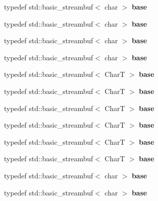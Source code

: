 \begin{DoxyCompactItemize}
\mbox{\label{structtest_ae7488bd18a7ecb2581088e9de82559ad}} 
typedef std\+::basic\+\_\+streambuf$<$ char $>$ {\bfseries base}
\item 
\mbox{\label{structtest_ae7488bd18a7ecb2581088e9de82559ad}} 
typedef std\+::basic\+\_\+streambuf$<$ char $>$ {\bfseries base}
\item 
\mbox{\label{structtest_ae7488bd18a7ecb2581088e9de82559ad}} 
typedef std\+::basic\+\_\+streambuf$<$ char $>$ {\bfseries base}
\item 
\mbox{\label{structtest_ae7488bd18a7ecb2581088e9de82559ad}} 
typedef std\+::basic\+\_\+streambuf$<$ char $>$ {\bfseries base}
\item 
\mbox{\label{structtest_a62a689a4683336b8f85ad0cb79e2e5d3}} 
typedef std\+::basic\+\_\+streambuf$<$ CharT $>$ {\bfseries base}
\item 
\mbox{\label{structtest_a62a689a4683336b8f85ad0cb79e2e5d3}} 
typedef std\+::basic\+\_\+streambuf$<$ CharT $>$ {\bfseries base}
\item 
\mbox{\label{structtest_a62a689a4683336b8f85ad0cb79e2e5d3}} 
typedef std\+::basic\+\_\+streambuf$<$ CharT $>$ {\bfseries base}
\item 
\mbox{\label{structtest_a62a689a4683336b8f85ad0cb79e2e5d3}} 
typedef std\+::basic\+\_\+streambuf$<$ CharT $>$ {\bfseries base}
\item 
\mbox{\label{structtest_a62a689a4683336b8f85ad0cb79e2e5d3}} 
typedef std\+::basic\+\_\+streambuf$<$ CharT $>$ {\bfseries base}
\item 
\mbox{\label{structtest_a62a689a4683336b8f85ad0cb79e2e5d3}} 
typedef std\+::basic\+\_\+streambuf$<$ CharT $>$ {\bfseries base}
\item 
\mbox{\label{structtest_ae7488bd18a7ecb2581088e9de82559ad}} 
typedef std\+::basic\+\_\+streambuf$<$ char $>$ {\bfseries base}
\item 
\mbox{\label{structtest_ae7488bd18a7ecb2581088e9de82559ad}} 
typedef std\+::basic\+\_\+streambuf$<$ char $>$ {\bfseries base}
\end{DoxyCompactItemize}
